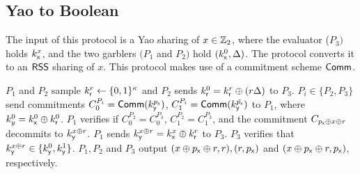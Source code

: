 \subsection{Yao to Boolean}
\begin{algorithm}[H]
\renewcommand{\thealgorithm}{}
\caption{$[x]^\Yao \rightarrow [x]^\Boolean$}
\label{protocol1}
The input of this protocol is a Yao sharing of $x \in \mathbb{Z}_2$, where the evaluator ($P_3)$ holds $k_{\mathsf{x}}^x$, and the two garblers $(P_1$ and $P_2)$ hold $(k_{\mathsf{x}}^0, \Delta)$. The protocol converts it to an $\mathsf{RSS}$ sharing of $x$. This protocol makes use of a commitment scheme $\mathsf{Comm}$.
\smallskip
\begin{algorithmic}[1]
\STATE $P_1$ and $P_2$ sample $k^r_{\mathsf{r}} \leftarrow \{0, 1\}^{\kappa}$ and $P_2$ sends $k^0_{\mathsf{r}} = k^r_{\mathsf{r}} \oplus (r \Delta)$ to $P_3$.
\STATE $P_i \in \{P_2, P_3\}$ send commitments $C_0^{P_i} = \mathsf{Comm}(k_{\mathsf{y}}^{p_{\mathsf{x}}})$, $C_1^{P_i} = \mathsf{Comm}(k_{\mathsf{y}}^{\bar{p_{\mathsf{x}}}})$ to $P_1$, where $k_y^0 = k_{\mathsf{x}}^0 \oplus k_{\mathsf{r}}^0$. 
\STATE $P_1$ verifies if $C_0^{P_2} = C_0^{P_3}$, $C_1^{P_2} = C_1^{P_3}$, and the commitment $C_{p_{\mathsf{x}} \oplus x \oplus r}$ decommits to $k_{\mathsf{y}}^{x \oplus r}$. $P_1$ sends $k_{\mathsf{y}}^{x \oplus r} = k_{\mathsf{x}}^x \oplus k_{\mathsf{r}}^r$ to $P_3$.
\STATE $P_3$ verifies that $k_{\mathsf{y}}^{x \oplus r} \in \{k_{\mathsf{y}}^0, k_{\mathsf{y}}^1\}$.
\STATE $P_1, P_2$ and $P_3$ output $(x \oplus p_{\mathsf{x}} \oplus r, r), (r, p_{\mathsf{x}})$ and $(x \oplus p_{\mathsf{x}} \oplus r, p_{\mathsf{x}})$, respectively.

\end{algorithmic}
\end{algorithm}




